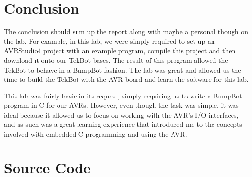 \documentclass[12pt,letterpaper]{article}
\begin{document}
\section{Conclusion}

The conclusion should sum up the report along with maybe a personal though on
the lab.  For example, in this lab, we were simply required to set up an
AVRStudio4 project with an example program, compile this project and then
download it onto our TekBot bases.  The result of this program allowed the
TekBot to behave in a BumpBot fashion.  The lab was great and allowed us the
time to build the TekBot with the AVR board and learn the software for this
lab.

This lab was fairly basic in its request, simply requiring us to write a
BumpBot program in C for our AVRs.  However, even though the task was simple,
it was ideal because it allowed us to focus on working with the AVR's I/O
interfaces, and as such was a great learning experience that introduced me to
the concepts involved with embedded C programming and using the AVR.

\section{Source Code}

\begin{verbatim}

\end{verbatim}
\end{document}
